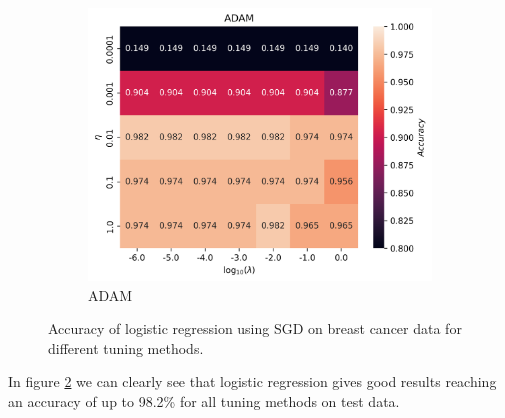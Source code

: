 \documentclass[11pt]{article}
\begin{document}
\begin{figure}[H]
\begin{subfigure}{.95\textwidth}
        \centering
        \includegraphics[width=.5\textwidth]{../figures/logreg_ADAM.png}
        \caption{ADAM}
        \label{fig:}
    \end{subfigure}
    \caption{Accuracy of logistic regression using SGD on breast cancer data for different tuning methods.}
    \label{fig:logreg_comp}
\end{figure}
In figure \ref{fig:logreg_comp} we can clearly see that logistic regression gives good results reaching an accuracy of up to 98.2\% for all tuning methods on test data.
\end{document}

